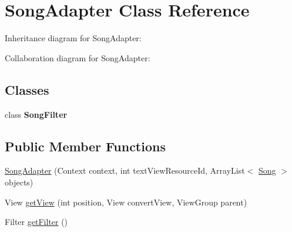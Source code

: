 \hypertarget{classcom_1_1axcoto_1_1shinjuku_1_1maki_1_1_song_adapter}{\section{\-Song\-Adapter \-Class \-Reference}
\label{classcom_1_1axcoto_1_1shinjuku_1_1maki_1_1_song_adapter}
}


\-Inheritance diagram for \-Song\-Adapter\-:


\-Collaboration diagram for \-Song\-Adapter\-:
\subsection*{\-Classes}
\begin{DoxyCompactItemize}
\item 
class {\bfseries \-Song\-Filter}
\end{DoxyCompactItemize}
\subsection*{\-Public \-Member \-Functions}
\begin{DoxyCompactItemize}
\item 
\hyperlink{classcom_1_1axcoto_1_1shinjuku_1_1maki_1_1_song_adapter_a3432f1657ef5cc6395cd6573f839172f}{\-Song\-Adapter} (\-Context context, int text\-View\-Resource\-Id, \-Array\-List$<$ \hyperlink{classcom_1_1axcoto_1_1shinjuku_1_1maki_1_1_song}{\-Song} $>$ objects)
\item 
\-View \hyperlink{classcom_1_1axcoto_1_1shinjuku_1_1maki_1_1_song_adapter_af6292d542d7937de5b4044234a2db905}{get\-View} (int position, \-View convert\-View, \-View\-Group parent)
\item 
\-Filter \hyperlink{classcom_1_1axcoto_1_1shinjuku_1_1maki_1_1_song_adapter_aaa1b3ed4b9b7277e559a83821dff5b4b}{get\-Filter} ()
\end{DoxyCompactItemize}


